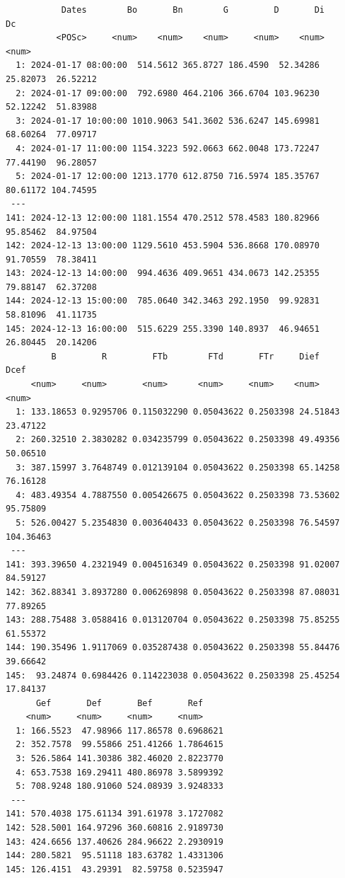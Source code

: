 \begin{itemize}
\begin{verbatim}
		   Dates        Bo       Bn        G         D       Di        Dc
		  <POSc>     <num>    <num>    <num>     <num>    <num>     <num>
  1: 2024-01-17 08:00:00  514.5612 365.8727 186.4590  52.34286 25.82073  26.52212
  2: 2024-01-17 09:00:00  792.6980 464.2106 366.6704 103.96230 52.12242  51.83988
  3: 2024-01-17 10:00:00 1010.9063 541.3602 536.6247 145.69981 68.60264  77.09717
  4: 2024-01-17 11:00:00 1154.3223 592.0663 662.0048 173.72247 77.44190  96.28057
  5: 2024-01-17 12:00:00 1213.1770 612.8750 716.5974 185.35767 80.61172 104.74595
 ---                                                                             
141: 2024-12-13 12:00:00 1181.1554 470.2512 578.4583 180.82966 95.85462  84.97504
142: 2024-12-13 13:00:00 1129.5610 453.5904 536.8668 170.08970 91.70559  78.38411
143: 2024-12-13 14:00:00  994.4636 409.9651 434.0673 142.25355 79.88147  62.37208
144: 2024-12-13 15:00:00  785.0640 342.3463 292.1950  99.92831 58.81096  41.11735
145: 2024-12-13 16:00:00  515.6229 255.3390 140.8937  46.94651 26.80445  20.14206
	     B         R         FTb        FTd       FTr     Dief      Dcef
	 <num>     <num>       <num>      <num>     <num>    <num>     <num>
  1: 133.18653 0.9295706 0.115032290 0.05043622 0.2503398 24.51843  23.47122
  2: 260.32510 2.3830282 0.034235799 0.05043622 0.2503398 49.49356  50.06510
  3: 387.15997 3.7648749 0.012139104 0.05043622 0.2503398 65.14258  76.16128
  4: 483.49354 4.7887550 0.005426675 0.05043622 0.2503398 73.53602  95.75809
  5: 526.00427 5.2354830 0.003640433 0.05043622 0.2503398 76.54597 104.36463
 ---                                                                        
141: 393.39650 4.2321949 0.004516349 0.05043622 0.2503398 91.02007  84.59127
142: 362.88341 3.8937280 0.006269898 0.05043622 0.2503398 87.08031  77.89265
143: 288.75488 3.0588416 0.013120704 0.05043622 0.2503398 75.85255  61.55372
144: 190.35496 1.9117069 0.035287438 0.05043622 0.2503398 55.84476  39.66642
145:  93.24874 0.6984426 0.114223038 0.05043622 0.2503398 25.45254  17.84137
	  Gef       Def       Bef       Ref
	<num>     <num>     <num>     <num>
  1: 166.5523  47.98966 117.86578 0.6968621
  2: 352.7578  99.55866 251.41266 1.7864615
  3: 526.5864 141.30386 382.46020 2.8223770
  4: 653.7538 169.29411 480.86978 3.5899392
  5: 708.9248 180.91060 524.08939 3.9248333
 ---                                       
141: 570.4038 175.61134 391.61978 3.1727082
142: 528.5001 164.97296 360.60816 2.9189730
143: 424.6656 137.40626 284.96622 2.2930919
144: 280.5821  95.51118 183.63782 1.4331306
145: 126.4151  43.29391  82.59758 0.5235947
\end{verbatim}


\end{itemize}

